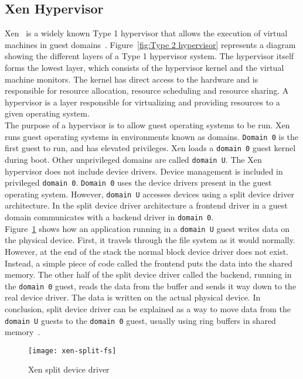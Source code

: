 \subsection{Xen Hypervisor}
Xen~\cite{Barham:2003:XAV:1165389.945462} is a widely known Type 1 hypervisor that allows the execution of virtual machines in guest domains~\cite{King_operatingsystem}. Figure~\ref{fig:Type 2 hypervisor} represents a diagram showing the different layers of a Type 1 hypervisor system. The hypervisor itself forms the lowest layer, which consists of the hypervisor kernel and the virtual machine monitors. The kernel has direct access to the hardware and is responsible for resource allocation, resource scheduling and resource sharing. A hypervisor is a layer responsible for virtualizing and providing resources to a given operating system.
\\[3mm]
The purpose of a hypervisor is to allow guest operating systems to be run. Xen runs guest operating systems in environments known as domains. \texttt{Domain 0} is the first guest to run, and has elevated privileges. Xen loads a \texttt{domain 0} guest kernel during boot. Other unprivileged domains are called \texttt{domain U}. The Xen hypervisor does not include device drivers. Device management is included in privileged \texttt{domain 0}. \texttt{Domain 0} uses the device drivers present in the guest operating system. However, \texttt{domain U} accesses devices using a split device driver architecture. In the split device driver architecture a frontend driver in a guest domain communicates with a backend driver in \texttt{domain 0}.
\\[3mm]
Figure~\ref{xen-split2} shows how an application running in a \texttt{domain U} guest writes data on the physical device. First, it travels through the file system as it would normally. However, at the end of the stack the normal block device driver does not exist. Instead, a simple piece of code called the frontend puts the data into the shared memory. The other half of the split device driver called the backend, running in the \texttt{domain 0} guest, reads the data from the buffer and sends it way down to the real device driver. The data is written on the actual physical device. In conclusion, split device driver can be explained as a way to move data from the \texttt{domain U} guests to the \texttt{domain 0} guest, usually using ring buffers in shared memory~\cite{Chisnall:2007:DGX:1407351}.
\begin{figure}[!h]
\centering
\texttt{[image: xen-split-fs]}
\caption{Xen split device driver}
\label{xen-split2}
\end{figure}
